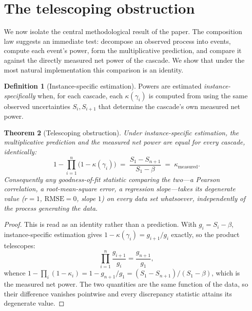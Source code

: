 \documentclass[11pt,a4paper]{article}
\theoremstyle{thmstyle}
\newtheorem{theorem}{Theorem}[section]
\theoremstyle{definition}
\newtheorem{definition}[theorem]{Definition}
\theoremstyle{remark}
\newcommand{\flo}{\beta}
\newcommand{\kap}{\kappa}
\begin{document}
\section{The telescoping obstruction}
\label{sec:telescoping}

We now isolate the central methodological result of the paper. The
composition law suggests an immediate test: decompose an observed process
into events, compute each event's power, form the multiplicative prediction,
and compare it against the directly measured net power of the cascade. We
show that under the most natural implementation this comparison is an
identity.

\begin{definition}[Instance-specific estimation]
\label{def:instance}
Powers are estimated \emph{instance-specifically} when, for each cascade,
each $\kap(\gamma_i)$ is computed from  using the same
observed uncertainties $S_i,S_{i+1}$ that determine the cascade's own
measured net power.
\end{definition}

\begin{theorem}[Telescoping obstruction]
\label{thm:telescoping}
Under instance-specific estimation, the multiplicative prediction and the
measured net power are equal for every cascade, identically:
\[
1-\prod_{i=1}^{n}\bigl(1-\kap(\gamma_i)\bigr)
\;=\;\frac{S_1-S_{n+1}}{S_1-\flo}
\;=\;\kap_{\mathrm{measured}} .
\]
Consequently any goodness-of-fit statistic comparing the two---a Pearson
correlation, a root-mean-square error, a regression slope---takes its
degenerate value ($r=1$, $\mathrm{RMSE}=0$, slope $1$) on every data set
whatsoever, independently of the process generating the data.
\end{theorem}

\begin{proof}
This is  read as an identity rather than a prediction.
With $g_i=S_i-\flo$, instance-specific estimation gives
$1-\kap(\gamma_i)=g_{i+1}/g_i$ exactly, so the product telescopes:
\[
\prod_{i=1}^{n}\frac{g_{i+1}}{g_i}=\frac{g_{n+1}}{g_1},
\]
whence $1-\prod_i(1-\kap_i)=1-g_{n+1}/g_1=(S_1-S_{n+1})/(S_1-\flo)$, which
is the measured net power. The two quantities are the same function of the
data, so their difference vanishes pointwise and every discrepancy statistic
attains its degenerate value.
\end{proof}
\end{document}
